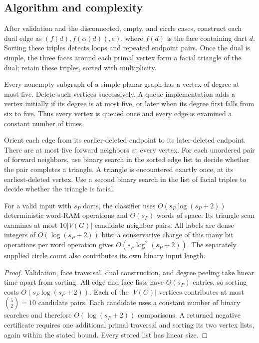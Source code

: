 \subsection{Algorithm and complexity}

After validation and the disconnected, empty, and circle cases, construct
each dual edge as $(f(d),f(\alpha(d)),e)$, where $f(d)$ is the face
containing dart $d$.  Sorting these triples detects loops and repeated
endpoint pairs.  Once the dual is simple, the three faces around each
primal vertex form a facial triangle of the dual; retain these triples,
sorted with multiplicity.

Every nonempty subgraph of a simple planar graph has a vertex of degree
at most five.  Delete such vertices successively.  A queue implementation
adds a vertex initially if its degree is at most five, or later when its
degree first falls from six to five.  Thus every vertex is queued once
and every edge is examined a constant number of times.

Orient each edge from its earlier-deleted endpoint to its later-deleted
endpoint.  There are at most five forward neighbors at every vertex.
For each unordered pair of forward neighbors, use binary search in the
sorted edge list to decide whether the pair completes a triangle.  A
triangle is encountered exactly once, at its earliest-deleted vertex.
Use a second binary search in the list of facial triples to decide
whether the triangle is facial.

\begin{theorem}
\label{thm:terminal-complexity}
For a valid input with $s_P$ darts, the classifier uses
$O(s_P\log(s_P+2))$ deterministic word-RAM operations and $O(s_P)$ words of
space.  Its triangle scan examines at most $10|V(G)|$ candidate neighbor
pairs.  All labels are dense integers of $O(\log(s_P+2))$ bits; a conservative
charge of this many bit operations per word operation gives
$O(s_P\log^2(s_P+2))$.  The separately supplied circle count also contributes
its own binary input length.
\end{theorem}

\begin{proof}
Validation, face traversal, dual construction, and degree peeling take
linear time apart from sorting.  All edge and face lists have $O(s_P)$
entries, so sorting costs $O(s_P\log(s_P+2))$.  Each of the $|V(G)|$ vertices
contributes at most $\binom{5}{2}=10$ candidate pairs.  Each candidate
uses a constant number of binary searches and therefore
$O(\log(s_P+2))$ comparisons.  A returned negative certificate requires one
additional primal traversal and sorting its two vertex lists, again
within the stated bound.  Every stored list has linear size.
\end{proof}


